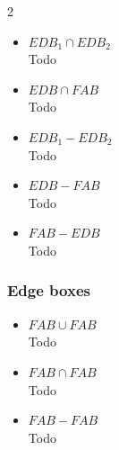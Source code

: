 \documentclass[twoside]{article}
\begin{document}
\begin{multicols}{2}
\begin{itemize}
\item $EDB_1 \cap EDB_2$
\\
Todo

\item $EDB \cap FAB$
\\
Todo

\item $EDB_1 - EDB_2$
\\
Todo

\item $EDB - FAB$
\\
Todo

\item $FAB - EDB$
\\
Todo
\end{itemize}

\subsubsection{Edge boxes}
\begin{itemize}
\item $FAB \cup FAB$
\\
Todo

\item $FAB \cap FAB$
\\
Todo

\item $FAB - FAB$
\\
Todo

\end{itemize}

\end{multicols}
\end{document}
